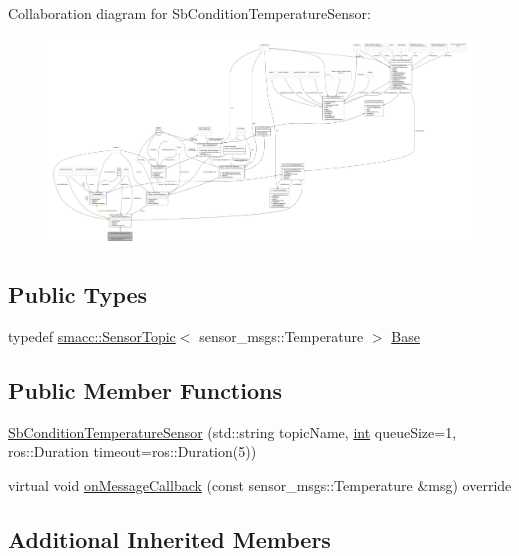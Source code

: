 Collaboration diagram for Sb\+Condition\+Temperature\+Sensor\+:
\nopagebreak
\begin{figure}[H]
\begin{center}
\leavevmode
\includegraphics[width=350pt]{classSbConditionTemperatureSensor__coll__graph}
\end{center}
\end{figure}
\subsection*{Public Types}
\begin{DoxyCompactItemize}
\item 
typedef \hyperlink{classsmacc_1_1SensorTopic}{smacc\+::\+Sensor\+Topic}$<$ sensor\+\_\+msgs\+::\+Temperature $>$ \hyperlink{classSbConditionTemperatureSensor_a5067362cd6c37e58f8f5f012b8a731fe}{Base}
\end{DoxyCompactItemize}
\subsection*{Public Member Functions}
\begin{DoxyCompactItemize}
\item 
\hyperlink{classSbConditionTemperatureSensor_a4405185bc4fa5b0b8dc285a69923b082}{Sb\+Condition\+Temperature\+Sensor} (std\+::string topic\+Name, \hyperlink{classint}{int} queue\+Size=1, ros\+::\+Duration timeout=ros\+::\+Duration(5))
\item 
virtual void \hyperlink{classSbConditionTemperatureSensor_a0bacff918eeb167bd115c4d8041c3055}{on\+Message\+Callback} (const sensor\+\_\+msgs\+::\+Temperature \&msg) override
\end{DoxyCompactItemize}
\subsection*{Additional Inherited Members}


